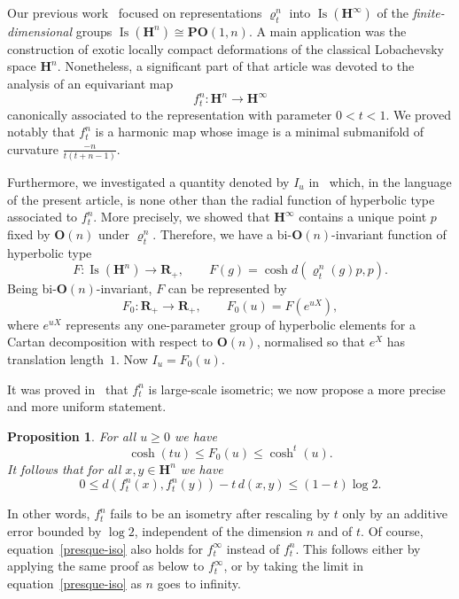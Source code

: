 \documentclass[11pt]{article}
\newtheorem{prop}[theo]{Proposition}
\theoremstyle{definition}
\numberwithin{equation}{section}
\numberwithin{figure}{section}
\numberwithin{table}{section}
\newcommand{\RR}{\mathbf{R}}
\newcommand{\HH}{\mathbf{H}}
\newcommand{\HHI}{\mathbf{H}^{\infty}}
\newcommand{\OO}{{\mathbf O}}
\newcommand{\PO}{\mathbf{PO}}
\newcommand{\Isomi}{{\Isom}(\HHI)}
\DeclareMathOperator{\Isom}{Is}
\newcommand{\ro}{\varrho}
\newcommand{\lra}{\longrightarrow}
\begin{document}
Our previous work~\cite{Monod-Py} focused on representations $\ro^n_t$ into $\Isomi$ of the \emph{finite-dimensional} groups $\Isom(\HH^n) \cong \PO(1,n)$. A main application was the construction of exotic locally compact deformations of the classical Lobachevsky space $\HH^n$. Nonetheless, a significant part of that article was devoted to the ana\-lysis of an equivariant map
\begin{equation*}
f^n_t\colon \HH^n \lra \HHI
\end{equation*}
canonically associated to the representation with parameter $0<t<1$. We proved notably that $f^n_t$ is a harmonic map whose image is a minimal submanifold of curvature $\frac{-n}{t(t+n-1)}$.

Furthermore, we investigated a quantity denoted by $I_u$ in~\cite[\S3.C]{Monod-Py} which, in the language of the present article, is none other than the radial function of hyperbolic type associated to $f^n_t$. More precisely, we showed that $\HHI$ contains a unique point $p$ fixed by $\OO(n)$ under $\ro^n_t$. Therefore, we have a bi-$\OO(n)$-invariant function of hyperbolic type
\begin{equation*}
F\colon \Isom(\HH^n) \lra \RR_+, \qquad F(g) = \cosh d\left(\ro^n_t(g) p, p\right).
\end{equation*}
Being bi-$\OO(n)$-invariant, $F$ can be represented by
\begin{equation*}
F_0\colon \RR_+ \lra \RR_+, \qquad F_0(u) = F(e^{u X}),
\end{equation*}
where $e^{u X}$ represents any one-parameter group of hyperbolic elements for a Cartan decomposition with respect to $\OO(n)$, normalised so that $e^X$ has translation length~$1$. Now $I_u=F_0(u)$.

It was proved in~\cite{Monod-Py} that $f^n_t$ is large-scale isometric; we now propose a more precise and more uniform statement.

\begin{prop}\label{prop:metric}
For all $u\geq 0$ we have
\begin{equation*}
\cosh(t u) \leq F_0(u) \leq \cosh^t(u).
\end{equation*}
It follows that for all $x,y\in\HH^n$ we have
\begin{equation}\label{presque-iso}
0 \leq d\left(f^n_t(x), f^n_t(y)\right) - t\, d(x,y) \leq (1-t) \log 2.
\end{equation}
\end{prop}

In other words, $f^n_t$ fails to be an isometry after rescaling by $t$ only by an additive error bounded by $\log 2$, independent of the dimension $n$ and of $t$. Of course, equation~\eqref{presque-iso} also holds for $f^\infty_t$ instead of $f^{n}_t$. This follows either by applying the same proof as below to $f^\infty_t$, or by taking the limit in equation~\eqref{presque-iso} as $n$ goes to infinity.
\end{document}
